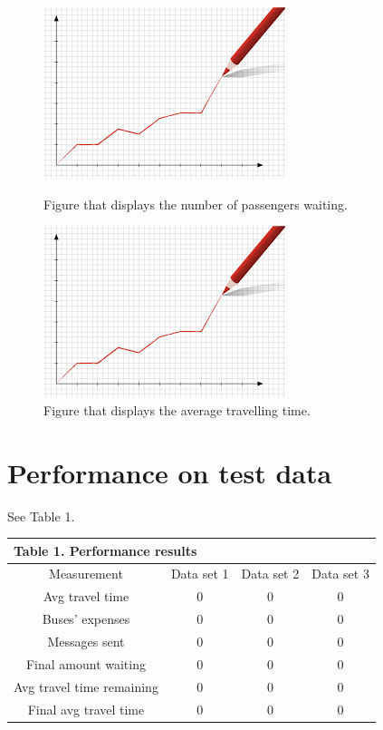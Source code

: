 \documentclass[a4paper]{article}
\begin{document}
\begin{figure}
\centering
\begin{minipage}{.5\textwidth}
  \includegraphics[width=.4\linewidth]{nr_pass_waiting.jpg}
  \caption{\label{fig:pass_waiting}Figure that displays the number of passengers waiting.}
\end{minipage}%
\begin{minipage}{.5\textwidth}
  \includegraphics[width=.4\linewidth]{avg_tt.jpg}
  \caption{\label{fig:avg_tt}Figure that displays the average travelling time.}
\end{minipage}
\end{figure}

\section{Performance on test data}

See Table 1.

\begin{table}
\begin{tabular}{ |c|c|c|c|  }
 \hline
 \multicolumn{4}{|l|}{Table 1. Performance results} \\
 \hline
  Measurement & Data set 1 & Data set 2 & Data set 3 \\
 \hline
  Avg travel time & 0 & 0 & 0\\
  Buses' expenses & 0 & 0 & 0\\
  Messages sent & 0 & 0 & 0\\
  Final amount waiting & 0 & 0 & 0\\
  Avg travel time remaining & 0 & 0 & 0\\
  Final avg travel time & 0 & 0 & 0\\
 \hline
\end{tabular}
\end{table}
\end{document}

